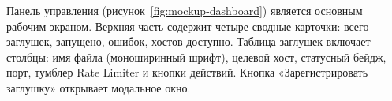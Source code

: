 






Панель управления (рисунок~\ref{fig:mockup-dashboard}) является основным рабочим экраном. Верхняя часть содержит четыре сводные карточки: всего заглушек, запущено, ошибок, хостов доступно. Таблица заглушек включает столбцы: имя файла (моноширинный шрифт), целевой хост, статусный бейдж, порт, тумблер Rate Limiter и кнопки действий. Кнопка «Зарегистрировать заглушку» открывает модальное окно.

